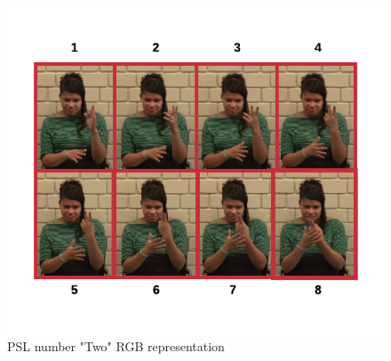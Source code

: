 \documentclass[twocolumn,conference]{article}
\begin{document}
\begin{figure}[hbt!]
\includegraphics[width=\linewidth]{images/dos-rgb-frames.png}
\caption{PSL number "Two" RGB representation}
\label{fig:rgb-two}
\end{figure}
\end{document}
